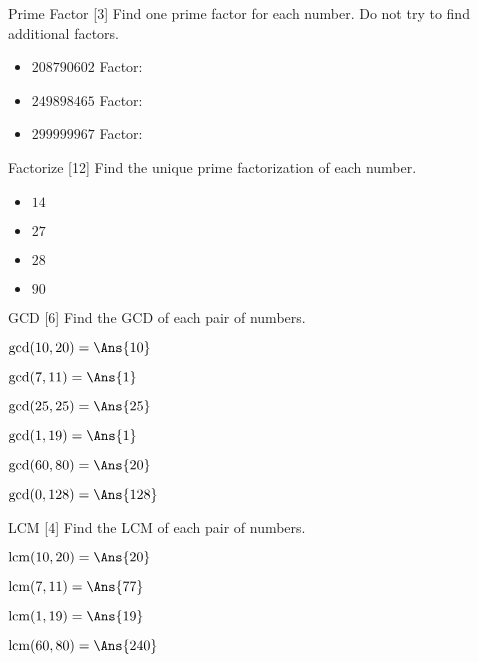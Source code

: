 \documentclass[12pt,letterpaper]{article}
\begin{document}
\begin{problem}{Prime Factor [3]}
 Find one prime factor for each number. Do not try to find additional factors.

 \begin{itemize}
  \item $208790602$ \hfill Factor: 
  \item $249898465$ \hfill Factor: 
  \item $299999967$ \hfill Factor: 
 \end{itemize}

\end{problem}

\begin{problem}{Factorize [12]}
 Find the unique prime factorization of each number.

 \begin{itemize}
  \item $14$ \hfill {}
  \item $27$ \hfill {}
  \item $28$ \hfill {}
  \item $90$ \hfill {}
 \end{itemize}
\end{problem}

\begin{problem}{GCD [6]}
 Find the GCD of each pair of numbers.

 \begin{itemize}
  \begin{multicols}{2}
   \item $\gcd(10, 20) = \Ans{10}$
   \item $\gcd(7, 11) = \Ans{1}$
   \item $\gcd(25, 25) = \Ans{25}$
   \item $\gcd(1, 19) = \Ans{1}$
   \item $\gcd(60, 80) = \Ans{20}$
   \item $\gcd(0, 128) = \Ans{128}$
  \end{multicols}
 \end{itemize}
\end{problem}

\begin{problem}{LCM [4]}
 Find the LCM of each pair of numbers.

 \begin{itemize}
  \begin{multicols}{2}
   \item $\operatorname{lcm}(10, 20) = \Ans{20}$
   \item $\operatorname{lcm}(7, 11) = \Ans{77}$
   \item $\operatorname{lcm}(1, 19) = \Ans{19}$
   \item $\operatorname{lcm}(60, 80) = \Ans{240}$
  \end{multicols}
 \end{itemize}
\end{problem}
\end{document}

